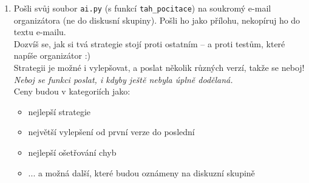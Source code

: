 \documentclass[a4paper,10pt]{article}
\begin{document}
\begin{enumerate}
\item Pošli svůj soubor \texttt{ai.py} (s funkcí \texttt{tah\_pocitace})
    na soukromý e-mail organizátora (ne do diskusní skupiny).
    Pošli ho jako přílohu, nekopíruj ho do textu e-mailu.
    \\Dozvíš se, jak si tvá strategie stojí proti ostatním – a proti testům, které napíše organizátor :)
    \\Strategii je možné i vylepšovat, a poslat několik různých verzí, takže se neboj!
    \\\emph{\small Neboj se funkci poslat, i kdyby ještě nebyla úplně dodělaná.}
    \\Ceny budou v kategoriích jako:
    \begin{itemize}
        \item nejlepší strategie
        \item největší vylepšení od první verze do poslední
        \item nejlepší ošetřování chyb
        \item ... a možná další, které budou oznámeny na diskuzní skupině
    \end{itemize}

\end{enumerate}
\end{document}
